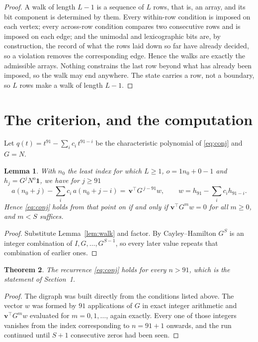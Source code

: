 \documentclass[11pt,a4paper]{article}
\theoremstyle{plain}
\newtheorem{theorem}{Theorem}
\newtheorem{lemma}[theorem]{Lemma}
\theoremstyle{definition}
\begin{document}
\begin{proof}
A walk of length $L-1$ is a sequence of $L$ rows, that is, an array, and its bit component
is determined by them. Every within-row condition is imposed on each vertex; every
across-row condition compares two consecutive rows and is imposed on each edge; and the
unimodal and lexicographic bits are, by construction, the record of what the rows laid down
so far have already decided, so a violation removes the corresponding edge. Hence the walks
are exactly the admissible arrays. Nothing constrains the last row beyond what has already
been imposed, so the walk may end anywhere. The state carries a row, not a boundary, so
$L$ rows make a walk of length $L-1$.
\end{proof}

\section{The criterion, and the computation}

Let $q(t)=t^{91}-\sum_i c_i\,t^{91-i}$ be the characteristic polynomial of
\eqref{eq:conj} and $G=N$.

\begin{lemma}\label{lem:crit}
With $n_0$ the least index for which $L\ge1$, $o=1n_0+0-1$ and
$h_j=G^{j}N^{o}\mathbf{1}$, we have for $j\ge91$
\[
a(n_0+j)-\sum_i c_i\,a(n_0+j-i)=\,\mathbf{v}^{\!\top}G^{\,j-91}w,
\qquad w=h_{91}-\sum_i c_ih_{91-i} .
\]
Hence \eqref{eq:conj} holds from that point on if and only if
$\mathbf{v}^{\!\top}G^{m}w=0$ for all $m\ge0$, and $m<S$ suffices.
\end{lemma}

\begin{proof}
Substitute Lemma~\ref{lem:walk} and factor. By Cayley--Hamilton $G^{S}$ is an integer
combination of $I,G,\dots,G^{S-1}$, so every later value repeats that combination of
earlier ones.
\end{proof}

\begin{theorem}
The recurrence \eqref{eq:conj} holds for every $n>91$, which is the statement of
Section~1.
\end{theorem}

\begin{proof}
The digraph was built directly from the conditions listed above. The vector $w$ was formed by
$91$ applications of $G$ in exact integer arithmetic and $\mathbf{v}^{\!\top}G^{m}w$
evaluated for $m=0,1,\dots$, again exactly. Every one of those integers vanishes from the
index corresponding to $n=91+1$ onwards, and the run continued until $S+1$ consecutive
zeros had been seen.
\end{proof}
\end{document}
